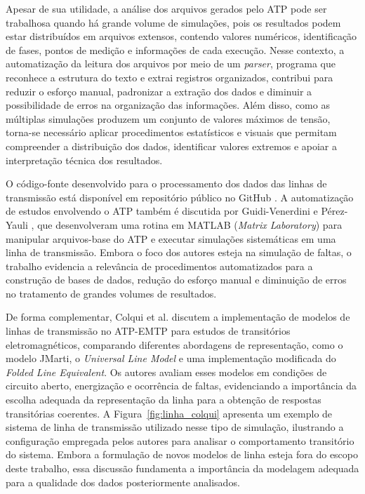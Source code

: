 \documentclass[
	12pt,				%
	openright,			%
	oneside,			%
	a4paper,			%
	chapter=TITLE,		%
	section=TITLE,		%
	subsection=TITLE,	%
	subsubsection=TITLE,%
	english,			%
	brazilian			%
	]{abntex2}
\theoremstyle{definition}
\begin{document}

Apesar de sua utilidade, a análise dos arquivos gerados pelo ATP pode ser trabalhosa quando há grande volume de simulações, pois os resultados podem estar distribuídos em arquivos extensos, contendo valores numéricos, identificação de fases, pontos de medição e informações de cada execução. Nesse contexto, a automatização da leitura dos arquivos por meio de um \textit{parser}, programa que reconhece a estrutura do texto e extrai registros organizados, contribui para reduzir o esforço manual, padronizar a extração dos dados e diminuir a possibilidade de erros na organização das informações. Além disso, como as múltiplas simulações produzem um conjunto de valores máximos de tensão, torna-se necessário aplicar procedimentos estatísticos e visuais que permitam compreender a distribuição dos dados, identificar valores extremos e apoiar a interpretação técnica dos resultados.

O código-fonte desenvolvido para o processamento dos dados das linhas de transmissão está disponível em repositório público no GitHub \cite{viana2026repositorio}. A automatização de estudos envolvendo o ATP também é discutida por Guidi-Venerdini e Pérez-Yauli \cite{guidi2013}, que desenvolveram uma rotina em MATLAB (\textit{Matrix Laboratory}) para manipular arquivos-base do ATP e executar simulações sistemáticas em uma linha de transmissão. Embora o foco dos autores esteja na simulação de faltas, o trabalho evidencia a relevância de procedimentos automatizados para a construção de bases de dados, redução do esforço manual e diminuição de erros no tratamento de grandes volumes de resultados.

De forma complementar, Colqui et al. \cite{colqui2022} discutem a implementação de modelos de linhas de transmissão no ATP-EMTP para estudos de transitórios eletromagnéticos, comparando diferentes abordagens de representação, como o modelo JMarti, o \textit{Universal Line Model} e uma implementação modificada do \textit{Folded Line Equivalent}. Os autores avaliam esses modelos em condições de circuito aberto, energização e ocorrência de faltas, evidenciando a importância da escolha adequada da representação da linha para a obtenção de respostas transitórias coerentes. A Figura~\ref{fig:linha_colqui} apresenta um exemplo de sistema de linha de transmissão utilizado nesse tipo de simulação, ilustrando a configuração empregada pelos autores para analisar o comportamento transitório do sistema. Embora a formulação de novos modelos de linha esteja fora do escopo deste trabalho, essa discussão fundamenta a importância da modelagem adequada para a qualidade dos dados posteriormente analisados.
\end{document}

